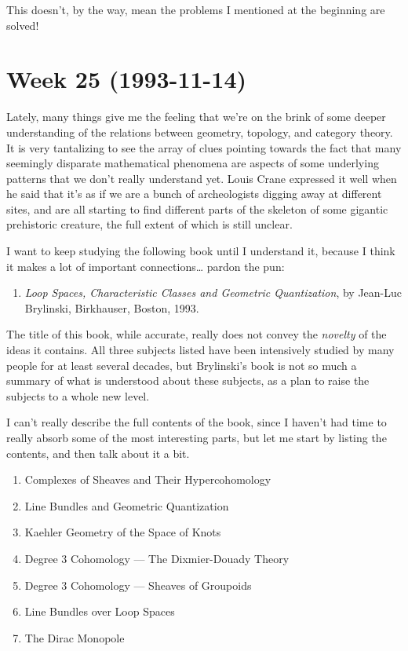 \documentclass{article}
\def\tightlist{}
\begin{document}
This doesn't, by the way, mean the problems I mentioned at the beginning
are solved!
\hypertarget{week25}{%
\section{Week 25 (1993-11-14)}\label{week25}}

Lately, many things give me the feeling that we're on the brink of some
deeper understanding of the relations between geometry, topology, and
category theory. It is very tantalizing to see the array of clues
pointing towards the fact that many seemingly disparate mathematical
phenomena are aspects of some underlying patterns that we don't really
understand yet. Louis Crane expressed it well when he said that it's as
if we are a bunch of archeologists digging away at different sites, and
are all starting to find different parts of the skeleton of some
gigantic prehistoric creature, the full extent of which is still
unclear.

I want to keep studying the following book until I understand it,
because I think it makes a lot of important connections\ldots{} pardon
the pun:

\begin{enumerate}
\def\labelenumi{\arabic{enumi})}
\tightlist
\item
  \emph{Loop Spaces, Characteristic Classes and Geometric Quantization},
  by Jean-Luc Brylinski, Birkhauser, Boston, 1993.
\end{enumerate}

The title of this book, while accurate, really does not convey the
\emph{novelty} of the ideas it contains. All three subjects listed have
been intensively studied by many people for at least several decades,
but Brylinski's book is not so much a summary of what is understood
about these subjects, as a plan to raise the subjects to a whole new
level.

I can't really describe the full contents of the book, since I haven't
had time to really absorb some of the most interesting parts, but let me
start by listing the contents, and then talk about it a bit.

\begin{enumerate}
\def\labelenumi{\arabic{enumi}.}
\tightlist
\item
  Complexes of Sheaves and Their Hypercohomology
\item
  Line Bundles and Geometric Quantization
\item
  Kaehler Geometry of the Space of Knots
\item
  Degree 3 Cohomology --- The Dixmier-Douady Theory
\item
  Degree 3 Cohomology --- Sheaves of Groupoids
\item
  Line Bundles over Loop Spaces
\item
  The Dirac Monopole
\end{enumerate}
\end{document}
